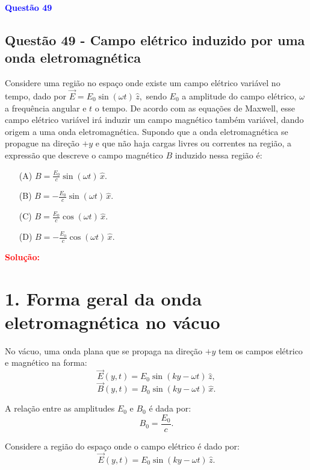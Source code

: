 \begin{flushleft}
\textbf{\textcolor{blue}{\Large Quest\~ao 49}}\\
\noindent
\subsection{Quest\~ao 49 - Campo elétrico induzido por uma onda eletromagnética}
Considere uma região no espaço onde existe um campo elétrico variável no tempo, dado por $\vec{E} = E_0 \sin(\omega t) \, \hat{z},$
sendo \(E_0\) a amplitude do campo elétrico, \(\omega\) a frequência angular e \(t\) o tempo. De acordo com as equações de Maxwell, 
esse campo elétrico variável irá induzir um campo magnético também variável, dando origem a uma onda eletromagnética. Supondo que a 
onda eletromagnética se propague na direção \(+y\) e que não haja cargas livres ou correntes na região, a expressão que descreve o 
campo magnético \(B\) induzido nessa região é:


\begin{itemize}
\item[(A)] $B = \frac{ E_0}{c} \sin(\omega t) \, \hat{x}.$
\item[(B)] $B = -\frac{E_0}{c} \sin(\omega t) \, \hat{x}.$
\item[(C)] $B = \frac{E_0}{c} \cos(\omega t) \, \hat{x}.$
\item[(D)] $B = -\frac{E_0}{c} \cos(\omega t) \, \hat{x}.$
\end{itemize}

\vspace{0.5cm}

\textcolor{red}{\textbf{Solução:}}\\



\section*{1. Forma geral da onda eletromagnética no vácuo}

No vácuo, uma onda plana que se propaga na direção \(+\hat{y}\) tem os campos elétrico e magnético na forma:
\[
\vec{E}(y,t) = E_0 \sin(k y - \omega t) \, \hat{z},
\]
\[
\vec{B}(y,t) = B_0 \sin(k y - \omega t) \, \hat{x}.
\]

A relação entre as amplitudes \(E_0\) e \(B_0\) é dada por:
\[
B_0 = \frac{E_0}{c}.
\]

Considere a região do espaço onde o campo elétrico é dado por:
\[
\vec{E}(y,t) = E_0 \sin(k y - \omega t) \, \hat{z}.
\]


\end{flushleft}

